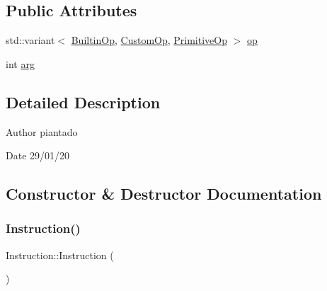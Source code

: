 \subsection*{Public Attributes}
\begin{DoxyCompactItemize}
\item 
std\+::variant$<$ \hyperlink{_instruction_8h_af2fb7c87c5854c5733d7bb0506b06de7}{Builtin\+Op}, \hyperlink{_instruction_8h_a3a20ca4a8f0ab220518b030cc23ffee4}{Custom\+Op}, \hyperlink{_instruction_8h_a227278394efd1e2313c727102db09ea9}{Primitive\+Op} $>$ \hyperlink{class_instruction_ace2bace7950c18f67d1568fb56e9e6de}{op}
\item 
int \hyperlink{class_instruction_a7ed399e29ec58e97a7b6311919f5d5ca}{arg}
\end{DoxyCompactItemize}


\subsection{Detailed Description}
\begin{DoxyAuthor}{Author}
piantado 
\end{DoxyAuthor}
\begin{DoxyDate}{Date}
29/01/20 
\end{DoxyDate}


\subsection{Constructor \& Destructor Documentation}
\mbox{\label{class_instruction_aebd15229c1651af49dcb203707e7a2d5}} 
\subsubsection{\texorpdfstring{Instruction()}{Instruction()}\hspace{0.1cm}{\footnotesize\ttfamily [1/4]}}
{\footnotesize\ttfamily Instruction\+::\+Instruction (\begin{DoxyParamCaption}{ }\end{DoxyParamCaption})\hspace{0.3cm}{\ttfamily [inline]}}

\mbox{\label{class_instruction_a7f672d88ba4ec174716bbac9adb8b1b0}} 
